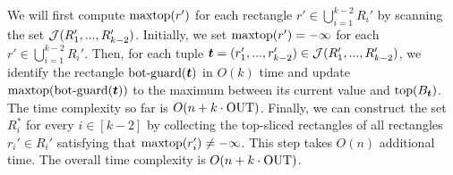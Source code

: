 We will first compute $\mathrm{maxtop}(r')$ for each rectangle $r' \in \bigcup_{i = 1}^{k-2}R_{i}'$ by scanning the set $\mathcal{J}(R_1',...,R_{k-2}')$. Initially, we set $\mathrm{maxtop}(r') = -\infty$ for each $r' \in \bigcup_{i = 1}^{k-2}R_{i}'$. Then, for each tuple $\textrm{\boldmath${t}$} = (r_1',...,r_{k-2}') \in \mathcal{J}(R_1',...,R_{k-2}')$, we identify the rectangle $\mathrm{bot\text{-}guard}(\textrm{\boldmath${t}$})$ in $O(k)$ time and 
 update $\mathrm{maxtop}(\mathrm{bot\text{-}guard}(\textrm{\boldmath${t}$}))$ to the maximum between its current value and $\mathrm{top}(B_{\textrm{\boldmath${t}$}})$. The time complexity so far is $O(n + k\cdot \mathrm{OUT})$.
Finally, we can construct the set $R_i^*$ for every $i \in [k-2]$ by collecting the top-sliced rectangles of all rectangles $r_i' \in R_i'$ satisfying that $\mathrm{maxtop}(r_i')\neq -\infty$. This step takes $O(n)$ additional time. The overall time complexity is $O(n + k\cdot \mathrm{OUT})$.